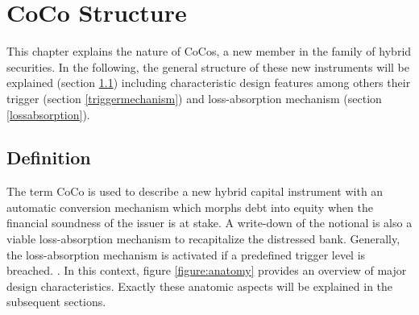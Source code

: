 \chapter{CoCo Structure}

This chapter explains the nature of CoCos, a new member in the family of hybrid securities. In the following, the general structure of these new instruments will be explained (section \ref{definitioncocos}) including characteristic design features among others their trigger (section \ref{triggermechanism}) and loss-absorption mechanism (section \ref{lossabsorption}).

\section{Definition}\label{definitioncocos}

The term CoCo is used to describe a new hybrid capital instrument with an automatic conversion mechanism which morphs debt into equity when the financial soundness of the issuer is at stake. A write-down of the notional is also a viable loss-absorption mechanism to recapitalize the distressed bank. Generally, the loss-absorption mechanism is activated if a predefined trigger level is breached. \citep{de2011pricing, zahres2011contingent}. In this context, figure \ref{figure:anatomy} provides an overview of major design characteristics. Exactly  these anatomic aspects will be explained in the subsequent sections.\\


